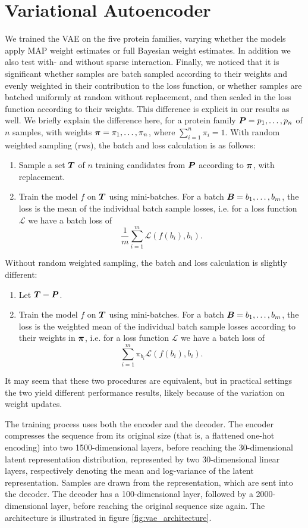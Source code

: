 \section{Variational Autoencoder}
\label{sec:variational_autoencoders_experiement}
We trained the VAE on the five protein families, varying whether the models apply MAP weight estimates or full Bayesian weight estimates. In addition we also test with- and without sparse interaction. Finally, we noticed that it is significant whether samples are batch sampled according to their weights and evenly weighted in their contribution to the loss function, or whether samples are batched uniformly at random without replacement, and then scaled in the loss function according to their weights. This difference is explicit in our results as well. We briefly explain the difference here, for a protein family $\bm{ P } = p_1, \ldots, p_n$ of $n$ samples, with weights $\bm{ \pi } = \pi_1, \ldots, \pi_n$, where $\sum_{i = 1}^n \pi_i = 1$. With random weighted sampling (rws), the batch and loss calculation is as follows:
\begin{enumerate}
    \item Sample a set $\bm{ T }$ of $n$ training candidates from $\bm{ P }$ according to $\bm{ \pi }$, with replacement.
    \item Train the model $f$ on $\bm{ T }$ using mini-batches. For a batch $\bm{ B } = b_1, \ldots, b_m$, the loss is the mean of the individual batch sample losses, i.e. for a loss function $\mathcal{L}$ we have a batch loss of 
    \[ \frac{1}{m}\sum_{i = 1}^{m} \mathcal{L}(f(b_i), b_i).\]
\end{enumerate}
Without random weighted sampling, the batch and loss calculation is slightly different:
\begin{enumerate}
    \item Let $\bm{ T } = \bm{ P }$.
    \item Train the model $f$ on $\bm{ T }$ using mini-batches. For a batch $\bm{ B } = b_1, \ldots, b_m$, the loss is the weighted mean of the individual batch sample losses according to their weights in $\bm{ \pi }$, i.e. for a loss function $\mathcal{L}$ we have a batch loss of 
    \[ \sum_{i = 1}^{m} \pi_{b_i} \mathcal{L}(f(b_i), b_i).\]
\end{enumerate}
It may seem that these two procedures are equivalent, but in practical settings the two yield different performance results, likely because of the variation on weight updates.

The training process uses both the encoder and the decoder. The encoder compresses the sequence from its original size (that is, a flattened one-hot encoding) into two 1500-dimensional layers, before reaching the 30-dimensional latent representation distribution, represented by two 30-dimensional linear layers, respectively denoting the mean and log-variance of the latent representation. Samples are drawn from the representation, which are sent into the decoder. The decoder has a 100-dimensional layer, followed by a 2000-dimensional layer, before reaching the original sequence size again. The architecture is illustrated in figure \ref{fig:vae_architecture}.

